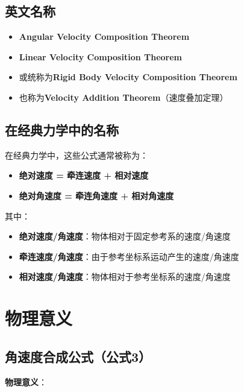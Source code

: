\documentclass[12pt,a4paper]{article}
\begin{document}
\subsection{英文名称}

\begin{itemize}
\item \textbf{Angular Velocity Composition Theorem}
\item \textbf{Linear Velocity Composition Theorem}
\item 或统称为\textbf{Rigid Body Velocity Composition Theorem}
\item 也称为\textbf{Velocity Addition Theorem}（速度叠加定理）
\end{itemize}

\subsection{在经典力学中的名称}

在经典力学中，这些公式通常被称为：
\begin{itemize}
\item \textbf{绝对速度 = 牵连速度 + 相对速度}
\item \textbf{绝对角速度 = 牵连角速度 + 相对角速度}
\end{itemize}

其中：
\begin{itemize}
\item \textbf{绝对速度/角速度}：物体相对于固定参考系的速度/角速度
\item \textbf{牵连速度/角速度}：由于参考坐标系运动产生的速度/角速度
\item \textbf{相对速度/角速度}：物体相对于参考坐标系的速度/角速度
\end{itemize}

\section{物理意义}

\subsection{角速度合成公式（公式3）}

\textbf{物理意义}：
\end{document}
